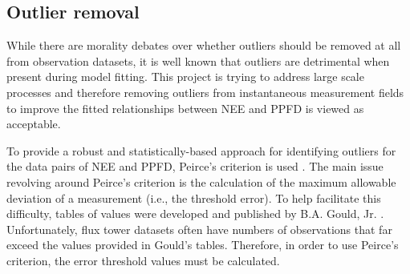 \subsection{Outlier removal}
\label{sec:mst1out}
While there are morality debates over whether outliers should be removed at all from observation datasets, it is well known that outliers are detrimental when present during model fitting.  
This project is trying to address large scale processes and therefore removing outliers from instantaneous measurement fields to improve the fitted relationships between NEE and PPFD is viewed as acceptable.

To provide a robust and statistically-based approach for identifying outliers for the data pairs of NEE and PPFD, Peirce's criterion is used \parencite{peirce52}.  
The main issue revolving around Peirce's criterion is the calculation of the maximum allowable deviation of a measurement (i.e., the threshold error).  
To help facilitate this difficulty, tables of values were developed and published by B.A. Gould, Jr. \parencite{gould55}.  
Unfortunately, flux tower datasets often have numbers of observations that far exceed the values provided in Gould's tables. 
Therefore, in order to use Peirce's criterion, the error threshold values must be calculated.

